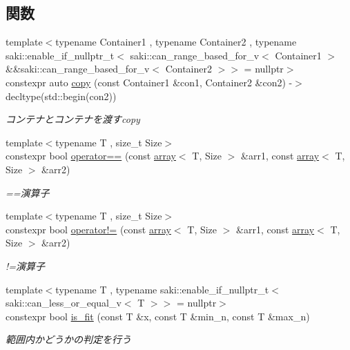 \subsection*{関数}
\begin{DoxyCompactItemize}
\item 
{\footnotesize template$<$typename Container1 , typename Container2 , typename saki\+::enable\+\_\+if\+\_\+nullptr\+\_\+t$<$ saki\+::can\+\_\+range\+\_\+based\+\_\+for\+\_\+v$<$ Container1 $>$ \&\&saki\+::can\+\_\+range\+\_\+based\+\_\+for\+\_\+v$<$ Container2 $>$$>$  = nullptr$>$ }\\constexpr auto \mbox{\hyperlink{namespacesaki_a3a9c67bf73207dfb61db4cd53ee35863}{copy}} (const Container1 \&con1, Container2 \&con2) -\/$>$ decltype(std\+::begin(con2))
\begin{DoxyCompactList}\small\item\em コンテナとコンテナを渡すcopy \end{DoxyCompactList}\item 
{\footnotesize template$<$typename T , size\+\_\+t Size$>$ }\\constexpr bool \mbox{\hyperlink{namespacesaki_a5ce8a66ed6ece15fa9ddeaec2746374d}{operator==}} (const \mbox{\hyperlink{classsaki_1_1array}{array}}$<$ T, Size $>$ \&arr1, const \mbox{\hyperlink{classsaki_1_1array}{array}}$<$ T, Size $>$ \&arr2)
\begin{DoxyCompactList}\small\item\em ==演算子 \end{DoxyCompactList}\item 
{\footnotesize template$<$typename T , size\+\_\+t Size$>$ }\\constexpr bool \mbox{\hyperlink{namespacesaki_aed742cc915a830fea9f4993c0a031c45}{operator!=}} (const \mbox{\hyperlink{classsaki_1_1array}{array}}$<$ T, Size $>$ \&arr1, const \mbox{\hyperlink{classsaki_1_1array}{array}}$<$ T, Size $>$ \&arr2)
\begin{DoxyCompactList}\small\item\em !=演算子 \end{DoxyCompactList}\item 
{\footnotesize template$<$typename T , typename saki\+::enable\+\_\+if\+\_\+nullptr\+\_\+t$<$ saki\+::can\+\_\+less\+\_\+or\+\_\+equal\+\_\+v$<$ T $>$$>$  = nullptr$>$ }\\constexpr bool \mbox{\hyperlink{namespacesaki_a45597d7382905409bada2316f78502fc}{is\+\_\+fit}} (const T \&x, const T \&min\+\_\+n, const T \&max\+\_\+n)
\begin{DoxyCompactList}\small\item\em 範囲内かどうかの判定を行う \end{DoxyCompactList}\item 

\end{DoxyCompactItemize}
